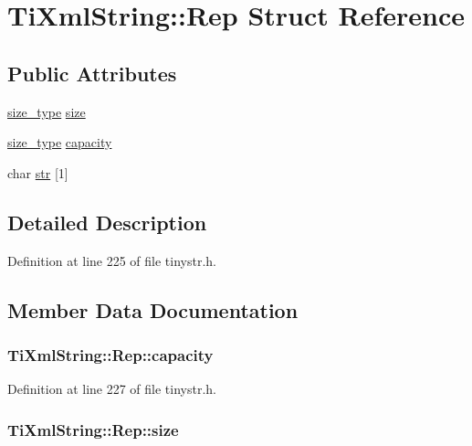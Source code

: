 \hypertarget{structTiXmlString_1_1Rep}{
\section{TiXmlString::Rep Struct Reference}
\label{da/d0f/structTiXmlString_1_1Rep}
}
\subsection*{Public Attributes}
\begin{DoxyCompactItemize}
\item 
\hyperlink{classTiXmlString_abeb2c1893a04c17904f7c06546d0b971}{size\_\-type} \hyperlink{structTiXmlString_1_1Rep_a3470330fe806a575dbb5909a1b908ac1}{size}
\item 
\hyperlink{classTiXmlString_abeb2c1893a04c17904f7c06546d0b971}{size\_\-type} \hyperlink{structTiXmlString_1_1Rep_a9f38da318212f4a2f6ebe0afdbfaf477}{capacity}
\item 
char \hyperlink{structTiXmlString_1_1Rep_a88a7037a489827ec9e59b008e11342b0}{str} \mbox{[}1\mbox{]}
\end{DoxyCompactItemize}


\subsection{Detailed Description}


Definition at line 225 of file tinystr.h.



\subsection{Member Data Documentation}
\hypertarget{structTiXmlString_1_1Rep_a9f38da318212f4a2f6ebe0afdbfaf477}{
\subsubsection[{capacity}]{ {\bf TiXmlString::Rep::capacity}}}
\label{da/d0f/structTiXmlString_1_1Rep_a9f38da318212f4a2f6ebe0afdbfaf477}


Definition at line 227 of file tinystr.h.

\hypertarget{structTiXmlString_1_1Rep_a3470330fe806a575dbb5909a1b908ac1}{
\subsubsection[{size}]{ {\bf TiXmlString::Rep::size}}}
\label{da/d0f/structTiXmlString_1_1Rep_a3470330fe806a575dbb5909a1b908ac1}


